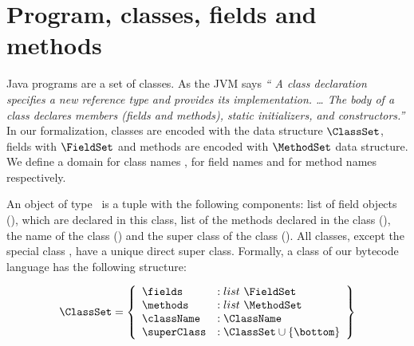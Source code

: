 
 \section{Program, classes, fields and methods}\label{clazz}
 Java programs are a set of classes. As the JVM says \textit{`` A class declaration specifies a new reference type and provides its implementation. \ldots
 The body of a class declares members (fields and methods), static initializers, and constructors.''}
 In our formalization, classes are encoded with the data structure $\ClassSet$,  fields with $\FieldSet$ and
 methods are encoded with $\MethodSet$ data structure. 
 We define a domain for class names \ClassName, for field names \FieldName{} and for method names \MethodName{} respectively.

 An object of type \ClassSet \ is a tuple with the following components: list of field objects (\fields), which are declared in this class,
 list of the methods declared in the class (\methods), the name of the class (\className)   and the super class of the class (\superClass).
 All classes, except the special class \Object, have a unique direct super class. Formally, a class of our bytecode language 
 has the following structure:


 $$ \begin{array}{l}
         \ClassSet = \left\{\begin{array}{ll} \fields    & :    list \ \FieldSet \\
                                          \methods    & :    list \ \MethodSet \\
					  \className  & :   \ClassName \\
					  \superClass & :   \ClassSet \cup \{ \bottom \}
                    \end{array} \right\}
   \end{array} $$

